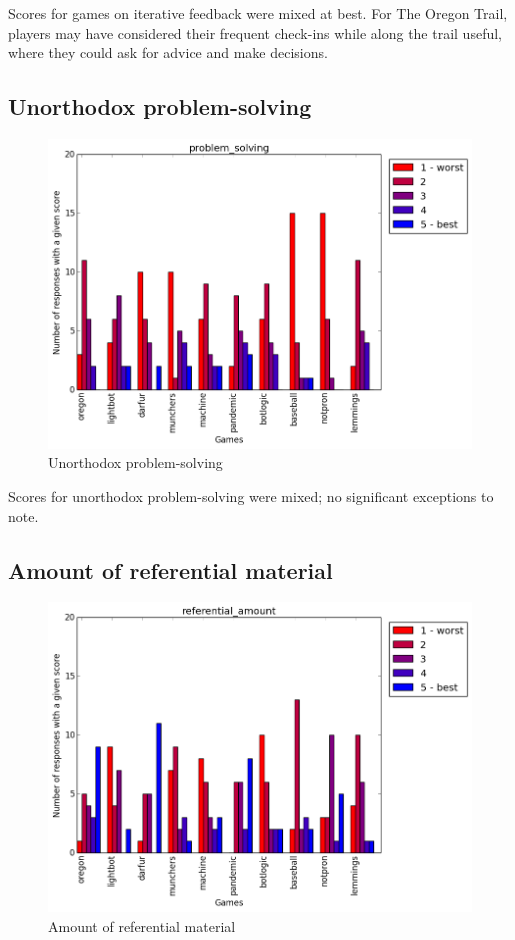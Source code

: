 				Scores for games on iterative feedback were mixed at best. For The Oregon Trail, players may have considered their frequent check-ins while along the trail useful, where they could ask for advice and make decisions.

			\subsection{Unorthodox problem-solving}
				\begin{figure}[] 
				\centering 
				\includegraphics[width=\textwidth, height=.4\textheight, keepaspectratio=true]{problem_solving_scores.png} 
				\caption{Unorthodox problem-solving}
				\end{figure}

				Scores for unorthodox problem-solving were mixed; no significant exceptions to note.

			\subsection{Amount of referential material}
				\begin{figure}[] 
				\centering 
				\includegraphics[width=\textwidth, height=.4\textheight, keepaspectratio=true]{referential_amount_scores.png} 
				\caption{Amount of referential material}
				\end{figure}

